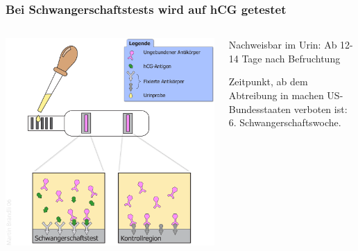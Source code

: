 \documentclass{beamer}
\begin{document}
\begin{frame}
\frametitle{Bei Schwangerschaftstests wird auf hCG getestet}

\begin{columns}[c]



\begin{column}{5cm}
\includegraphics[width=\textwidth]{Schwangerschaftstest_Schema.png}
\end{column}


\begin{column}{5cm}

Nachweisbar im Urin: Ab 12-14 Tage nach Befruchtung 

\pause

Zeitpunkt, ab dem Abtreibung in machen US-Bundesstaaten verboten ist: 6. Schwangerschaftswoche.  




\end{column}

\end{columns}

\end{frame}



\end{document}
